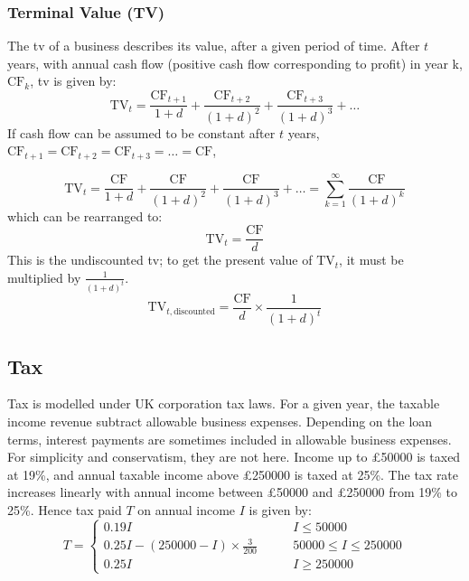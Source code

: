 \documentclass{report_template_oxford}
\begin{document}
\subsubsection{Terminal Value (TV)}
\label{TermValue}
The \gls{tv} of a business describes its  value, after a given period of time. After \(t\) years, with annual cash flow (positive cash flow corresponding to profit) in year k, \(\text{CF}_k\), \gls{tv} is given by:
\begin{equation}
    \text{TV}_t=\frac{\text{CF}_{t+1}}{1+d}+\frac{\text{CF}_{t+2}}{(1+d)^2}+\frac{\text{CF}_{t+3}}{(1+d)^3}+\dots
\end{equation}
If cash flow can be assumed to be constant after \(t\) years, \(\text{CF}_{t+1}=\text{CF}_{t+2}=\text{CF}_{t+3}=\dots=\text{CF}\),

\begin{equation}
    \text{TV}_t=\frac{\text{CF}}{1+d}+\frac{\text{CF}}{(1+d)^2}+\frac{\text{CF}}{(1+d)^3}+\dots = \sum_{k=1}^\infty \frac{\text{CF}}{(1+d)^k}
\end{equation}
which can be rearranged to:
\begin{equation}
    \text{TV}_t=\frac{\text{CF}}{d}
\end{equation}
This is the undiscounted \gls{tv}; to get the present value of \(\text{TV}_t\), it must be multiplied by \(\frac1{(1+d)^t}\).
\begin{equation}
    \text{TV}_{t, \text{discounted}}=\frac{\text{CF}}{d}\times \frac 1{(1+d)^t}
    \label{equ:DTV}
\end{equation}

\subsection{Tax}
\label{Tax}
Tax is modelled under UK corporation tax laws. For a given year, the taxable income revenue subtract allowable business expenses. Depending on the loan terms, interest payments are sometimes included in allowable business expenses. For simplicity and conservatism, they are not here. Income up to £50000 is taxed at 19\%, and annual taxable income above £250000 is taxed at 25\%. The tax rate increases linearly with annual income between £50000 and £250000 from 19\% to 25\%. Hence tax paid \(T\) on annual income \(I\) is given by:
\begin{equation}
    T=
    \begin{cases} 
        0.19I & I\le 50000\\
        0.25I-(250000-I)\times \frac 3{200} \quad \quad & 50000\le I \le 250000 \\
        0.25I  & I\ge 250000
    \end{cases}
\end{equation}
\end{document}

